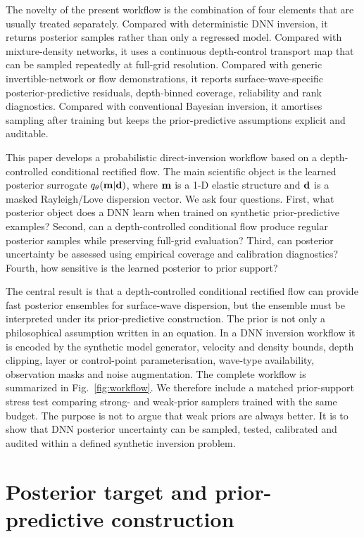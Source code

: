 \documentclass[referee]{gji}
\begin{document}
The novelty of the present workflow is the combination of four elements that are usually treated separately. Compared with deterministic DNN inversion, it returns posterior samples rather than only a regressed model. Compared with mixture-density networks, it uses a continuous depth-control transport map that can be sampled repeatedly at full-grid resolution. Compared with generic invertible-network or flow demonstrations, it reports surface-wave-specific posterior-predictive residuals, depth-binned coverage, reliability and rank diagnostics. Compared with conventional Bayesian inversion, it amortises sampling after training but keeps the prior-predictive assumptions explicit and auditable.

This paper develops a probabilistic direct-inversion workflow based on a depth-controlled conditional rectified flow. The main scientific object is the learned posterior surrogate $q_\theta({\bf m}|{\bf d})$, where ${\bf m}$ is a 1-D elastic structure and ${\bf d}$ is a masked Rayleigh/Love dispersion vector. We ask four questions. First, what posterior object does a DNN learn when trained on synthetic prior-predictive examples? Second, can a depth-controlled conditional flow produce regular posterior samples while preserving full-grid evaluation? Third, can posterior uncertainty be assessed using empirical coverage and calibration diagnostics? Fourth, how sensitive is the learned posterior to prior support?

The central result is that a depth-controlled conditional rectified flow can provide fast posterior ensembles for surface-wave dispersion, but the ensemble must be interpreted under its prior-predictive construction. The prior is not only a philosophical assumption written in an equation. In a DNN inversion workflow it is encoded by the synthetic model generator, velocity and density bounds, depth clipping, layer or control-point parameterisation, wave-type availability, observation masks and noise augmentation. The complete workflow is summarized in Fig.~\ref{fig:workflow}. We therefore include a matched prior-support stress test comparing strong- and weak-prior samplers trained with the same budget. The purpose is not to argue that weak priors are always better. It is to show that DNN posterior uncertainty can be sampled, tested, calibrated and audited within a defined synthetic inversion problem.

\section{Posterior target and prior-predictive construction}
\end{document}
